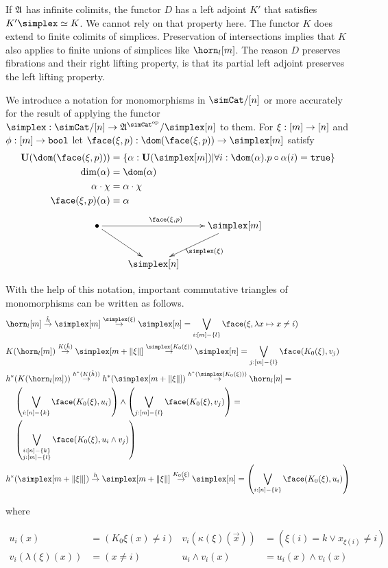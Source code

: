 \documentclass[csh.tex]{subfiles}
\begin{document}
If $\mathfrak A$ has infinite colimits, the functor $D$ has a left adjoint $K'$ that satisfies $K'\simplex\simeq K$. We cannot rely on that property here. The functor $K$ does extend to finite colimits of simplices. Preservation of intersections implies that $K$ also applies to finite unions of simplices like $\horn_l[m]$. The reason $D$ preserves fibrations and their right lifting property, is that its partial left adjoint preserves the left lifting property. 

\begin{definition} We introduce a notation for monomorphisms in $\simCat/[n]$ or more accurately for the result of applying the functor $\simplex\of \simCat/[n] \to \ambient\s/\simplex[n]$ to them. For $\xi:[m]\to[n]$ and $\phi:[m]\to\mathtt{bool}$ let $\face(\xi,p)\of \dom(\face(\xi,p))\to \simplex[m]$ satisfy
\begin{align*}
\base(\dom(\face(\xi,p))) &= \set{\alpha\of\base(\simplex[m])\middle|\forall i\of \dom(\alpha).p\circ\alpha(i)=\true}\\
\dim(\alpha) &= \dom(\alpha)\\
\alpha\cdot\chi &= \alpha\cdot\chi\\
\face(\xi,p)(\alpha) &= \alpha
\end{align*}
\[\xymatrix{
\bullet\ar[rr]^{\face(\xi,p)}\ar[dr] && \simplex[m]\ar[dl]^{\simplex(\xi)} \\
& \simplex[n]
}\]
\end{definition}

With the help of this notation, important commutative triangles of monomorphisms can be written as follows.
\begin{align}
&\horn_l[m]\stackrel{\hat h}\to \simplex[m]\stackrel{\simplex(\xi)}\to \simplex[n] = \bigvee_{i\of [m]-\set l} \face(\xi,\function x{x\neq i})\\
&K(\horn_l[m])\stackrel{K(\hat h)}\to \simplex[m+\norm\xi]\stackrel{\simplex(K_0(\xi))}\to \simplex[n] = \bigvee_{j\of [m]-\set l} \face(K_0(\xi),v_j)\\
&h\ri(K(\horn_l[m]))\stackrel{h\ri(K(\hat h))}\to h\ri(\simplex[m+\norm\xi])\stackrel{h\ri(\simplex(K_0(\xi)))}\to \horn_l[n] = \\
&\quad\left(\bigvee_{i\of[n]-\set k} \face(K_0(\xi),u_i)\right)\wedge\left(\bigvee_{j\of [m]-\set l} \face(K_0(\xi),v_j)\right)=\\
&\quad\left(\bigvee_{\substack{i\of[n]-\set k\\j\of [m]-\set l}}\face(K_0(\xi),u_i\land v_j)\right)\\
&h\ri(\simplex[m+\norm\xi])\stackrel{h}\to \simplex[m+\norm\xi]\stackrel{K_0(\xi)}\to \simplex[n] =\left(\bigvee_{i\of[n]-\set k} \face(K_0(\xi),u_i)\right)
\end{align}
\begin{center}
where
\end{center}
\begin{align*}
u_i(x) &= (K_0\xi(x)\neq i) & 
v_i(\kappa(\xi)(\vec x)) &= (\xi(i)= k\vee x_{\xi(i)}\neq i)\\
v_i(\lambda(\xi)(x)) &= (x\neq i)&
u_i\land v_i(x) &= u_i(x)\land v_i(x)
\end{align*}
\end{document}
